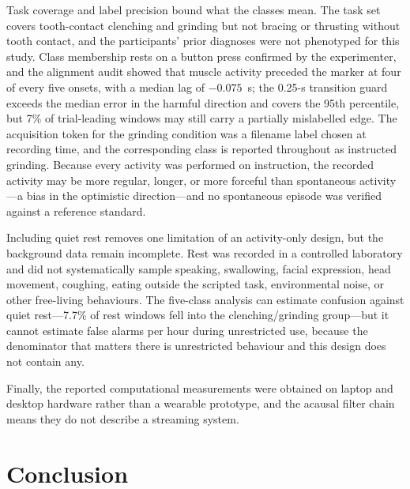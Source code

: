 \documentclass[pdflatex,sn-nature,iicol]{sn-jnl}
\begin{document}
Task coverage and label precision bound what the classes mean. The task set covers tooth-contact clenching and grinding but not bracing or thrusting without tooth contact, and the participants' prior diagnoses were not phenotyped for this study. Class membership rests on a button press confirmed by the experimenter, and the alignment audit showed that muscle activity preceded the marker at four of every five onsets, with a median lag of $-0.075$~s; the 0.25-s transition guard exceeds the median error in the harmful direction and covers the 95th percentile, but 7\% of trial-leading windows may still carry a partially mislabelled edge. The acquisition token for the grinding condition was a filename label chosen at recording time, and the corresponding class is reported throughout as instructed grinding. Because every activity was performed on instruction, the recorded activity may be more regular, longer, or more forceful than spontaneous activity---a bias in the optimistic direction---and no spontaneous episode was verified against a reference standard.

Including quiet rest removes one limitation of an activity-only design, but the background data remain incomplete. Rest was recorded in a controlled laboratory and did not systematically sample speaking, swallowing, facial expression, head movement, coughing, eating outside the scripted task, environmental noise, or other free-living behaviours. The five-class analysis can estimate confusion against quiet rest---7.7\% of rest windows fell into the clenching/grinding group---but it cannot estimate false alarms per hour during unrestricted use, because the denominator that matters there is unrestricted behaviour and this design does not contain any.

Finally, the reported computational measurements were obtained on laptop and desktop hardware rather than a wearable prototype, and the acausal filter chain means they do not describe a streaming system.

\section{Conclusion}
\end{document}
